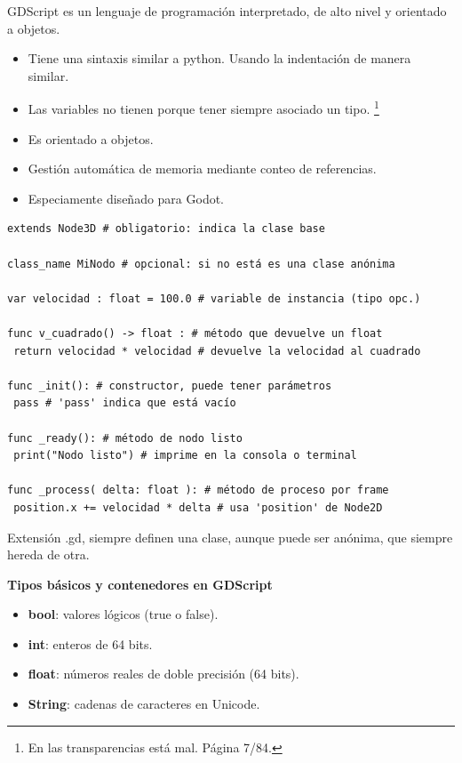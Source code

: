 \documentclass[12pt]{book} %
\providecommand{\tightlist}{%
  \setlength{\itemsep}{0pt}\setlength{\parskip}{0pt}}
\begin{document}
GDScript es un lenguaje de programación interpretado, de alto nivel y
orientado a objetos.

\begin{itemize}
\tightlist
\item
  Tiene una sintaxis similar a python. Usando la indentación de manera
  similar.
\item
  Las variables no tienen porque tener siempre asociado un tipo.
  \footnote{En las transparencias está mal. Página 7/84.}
\item
  Es orientado a objetos.
\item
  Gestión automática de memoria mediante conteo de referencias.
\item
  Especiamente diseñado para Godot.
\end{itemize}

\begin{lstlisting}
extends Node3D # obligatorio: indica la clase base

class_name MiNodo # opcional: si no está es una clase anónima

var velocidad : float = 100.0 # variable de instancia (tipo opc.)

func v_cuadrado() -> float : # método que devuelve un float
 return velocidad * velocidad # devuelve la velocidad al cuadrado

func _init(): # constructor, puede tener parámetros
 pass # 'pass' indica que está vacío

func _ready(): # método de nodo listo
 print("Nodo listo") # imprime en la consola o terminal

func _process( delta: float ): # método de proceso por frame
 position.x += velocidad * delta # usa 'position' de Node2D
\end{lstlisting}

Extensión .gd, siempre definen una clase, aunque puede ser anónima, que
siempre hereda de otra.

\textbf{Tipos básicos y contenedores en GDScript}

\begin{itemize}
\item \textbf{bool}: valores lógicos (true o false).
\item \textbf{int}: enteros de 64 bits.
\item \textbf{float}: números reales de doble precisión (64 bits).
\item \textbf{String}: cadenas de caracteres en Unicode.
\end{itemize}
\end{document}
